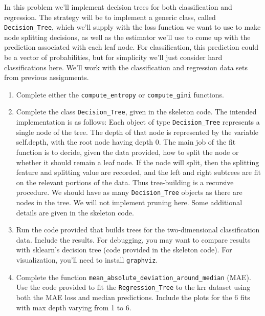\documentclass{article}
\theoremstyle{plain}
\theoremstyle{definition}
\begin{document}
In this problem we'll implement decision trees for both classification
and regression. The strategy will be to implement a generic class,
called \texttt{Decision\_Tree}, which we'll supply with the loss function
we want to use to make node splitting decisions, as well as the estimator
we'll use to come up with the prediction associated with each leaf
node. For classification, this prediction could be a vector of probabilities,
but for simplicity we'll just consider hard classifications here.
We'll work with the classification and regression data sets from previous
assignments.
\begin{enumerate}
\setcounter{enumi}{\value{saveenum}}
\item Complete either the \texttt{compute\_entropy} or \texttt{compute\_gini}
functions.

\item Complete the class \texttt{Decision\_Tree}, given in
the skeleton code. The intended implementation is as follows: Each
object of type \texttt{Decision\_Tree} represents a single node of
the tree. The depth of that node is represented by the variable self.depth,
with the root node having depth 0. The main job of the fit function
is to decide, given the data provided, how to split the node or whether
it should remain a leaf node. If the node will split, then the splitting
feature and splitting value are recorded, and the left and right subtrees
are fit on the relevant portions of the data. Thus tree-building is
a recursive procedure. We should have as many \texttt{Decision\_Tree}
objects as there are nodes in the tree. We will not implement pruning\textbf{
}here. Some additional details are given in the skeleton code.

\item Run the code provided that builds trees for the two-dimensional
classification data. Include the results. For debugging, you may want
to compare results with sklearn's decision tree (code provided in the skeleton code). For visualization,
you'll need to install \texttt{graphviz}.

\item  Complete the function \texttt{mean\_absolute\_deviation\_around\_median}
(MAE). Use the code provided to fit the \texttt{Regression\_Tree} to
the krr dataset using both the MAE loss and median predictions. Include the plots for the 6 fits with max depth varying from 1 to 6.

\setcounter{saveenum}{\value{enumi}}
\end{enumerate}
\end{document}
